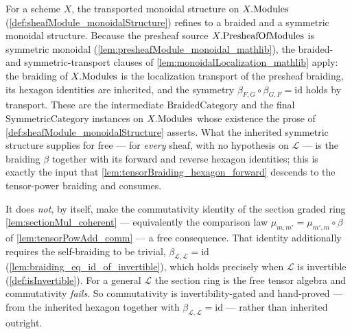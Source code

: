 \begin{corollary}
  \label{cor:sheafModule_braided_symmetric}
  For a scheme \(X\), the transported monoidal structure on \(X.\mathrm{Modules}\)
  (\cref{def:sheafModule_monoidalStructure}) refines to a braided and a symmetric
  monoidal structure. Because the presheaf source \(X.\mathrm{PresheafOfModules}\) is symmetric
  monoidal (\cref{lem:presheafModule_monoidal_mathlib}), the braided- and
  symmetric-transport clauses of \cref{lem:monoidalLocalization_mathlib} apply:
  the braiding of \(X.\mathrm{Modules}\) is the localization transport of the presheaf
  braiding, its hexagon identities are inherited, and the symmetry
  \(\beta_{F,G} \circ \beta_{G,F} = \mathrm{id}\) holds by transport. These are
  the intermediate \(\mathrm{BraidedCategory}\) and the final
  \(\mathrm{SymmetricCategory}\) instances on \(X.\mathrm{Modules}\) whose existence the
  prose of \cref{def:sheafModule_monoidalStructure} asserts. What the inherited
  symmetric structure supplies for free --- for \emph{every} sheaf, with no
  hypothesis on \(\mathcal{L}\) --- is the braiding \(\beta\) together with its
  forward and reverse hexagon identities; this is exactly the input that
  \cref{lem:tensorBraiding_hexagon_forward} descends to the tensor-power braiding
  and consumes.

  It does \emph{not}, by itself, make the commutativity identity of the section
  graded ring \cref{lem:sectionMul_coherent} --- equivalently the comparison law
  \(\mu_{m,m'} = \mu_{m',m} \circ \beta\) of \cref{lem:tensorPowAdd_comm} --- a
  free consequence. That identity additionally requires the self-braiding to be
  trivial, \(\beta_{\mathcal{L},\mathcal{L}} = \mathrm{id}\)
  (\cref{lem:braiding_eq_id_of_invertible}), which holds precisely when
  \(\mathcal{L}\) is invertible (\cref{def:isInvertible}). For a general
  \(\mathcal{L}\) the section ring is the free tensor algebra and commutativity
  \emph{fails}. So commutativity is invertibility-gated and hand-proved --- from
  the inherited hexagon together with \(\beta_{\mathcal{L},\mathcal{L}} =
  \mathrm{id}\) --- rather than inherited outright.
\end{corollary}

